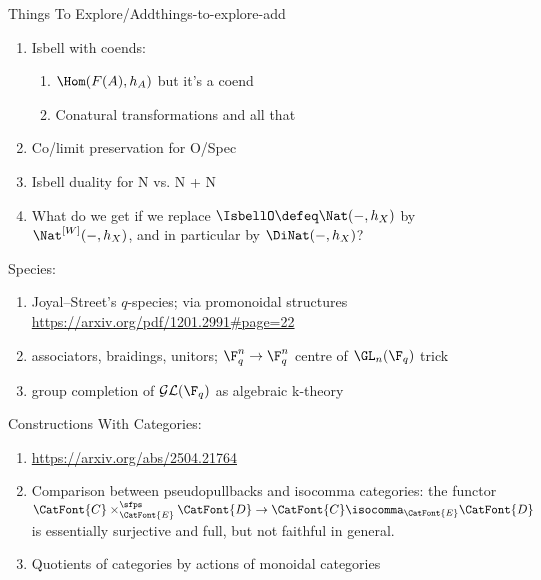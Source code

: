 \begin{remark}{Things To Explore/Add}{things-to-explore-add}
\begin{enumerate}
\begin{enumerate}
                \item I think there is a canonical morphism
                    \[
                        \SheafFont{F}\boxtimes_{\CatFont{C}}\IsbellO(\SheafFont{F})%
                        \to%
                        \Tr(\CatFont{C}).%
                    \]%
                    By the way, what is $\Tr(\SimplexCategory)$? What is $\Tr(\B{A})$? What about $\Nat(\id_{\CatFont{C}},\id_{\CatFont{C}})$ for $\CatFont{C}=\B{A}$ or $\CatFont{C}=\SimplexCategory$
            \end{enumerate}
        \item Isbell with coends:
            \begin{enumerate}
                \item $\Hom(F(A),h_A)$ but it's a coend
                \item Conatural transformations and all that
            \end{enumerate}
        \item Co/limit preservation for O/Spec
        \item Isbell duality for N vs. N + N
        \item What do we get if we replace $\IsbellO\defeq\Nat(-,h_{X})$ by $\Nat^{[W]}(-,h_{X})$, and in particular by $\DiNat(-,h_{X})$?
    \end{enumerate}
    Species:
    \begin{enumerate}
        \item Joyal--Street's $q$-species; via promonoidal structures \url{https://arxiv.org/pdf/1201.2991#page=22}
        \item associators, braidings, unitors; $\F^{n}_{q}\to\F^{n}_{q}$ centre of $\GL_{n}(\F_{q})$ trick
        \item group completion of $\mathcal{GL}(\F_{q})$ as algebraic k-theory
    \end{enumerate}
    Constructions With Categories:
    \begin{enumerate}
        \item \url{https://arxiv.org/abs/2504.21764}
        \item Comparison between pseudopullbacks and isocomma categories: the  functor $\CatFont{C}\times^{\sfps}_{\CatFont{E}}\CatFont{D}\to\CatFont{C}\isocomma_{\CatFont{E}}\CatFont{D}$ is essentially surjective and full, but not faithful in general.
        \item Quotients of categories by actions of monoidal categories
            \begin{enumerate}

\end{enumerate}
\end{enumerate}
\end{remark}
